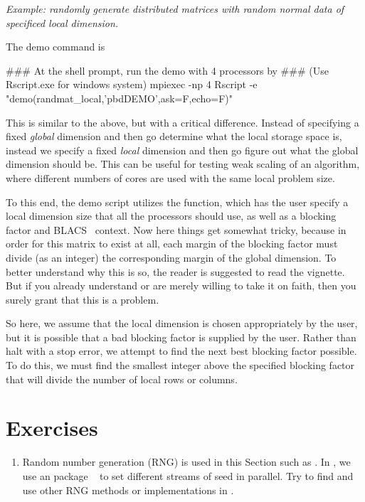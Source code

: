 \emph{Example:  randomly generate distributed matrices with random normal data 
of specificed local dimension.}

The demo command is
\begin{Command}
### At the shell prompt, run the demo with 4 processors by
### (Use Rscript.exe for windows system)
mpiexec -np 4 Rscript -e "demo(randmat_local,'pbdDEMO',ask=F,echo=F)"
\end{Command}

This is similar to the above, but with a critical difference.  Instead of 
specifying a fixed \emph{global} dimension and then go determine what the local 
storage space is, instead we specify a fixed \emph{local} dimension and then go 
figure out what the global dimension should be.  This can be useful for testing 
weak scaling of an algorithm, where different numbers of cores are used with the 
same local problem size.

To this end, the demo script utilizes the  function, 
which has the user specify a local dimension size that all the processors should 
use, as well as a blocking factor and BLACS~ context.  Now 
here things get somewhat tricky, because in order for this matrix to exist at 
all, each margin of the blocking factor must divide (as an integer) the 
corresponding margin of the global dimension.  To better understand why this is 
so, the reader is suggested to read the  vignette.  But if you 
already understand or are merely willing to take it on faith, then you surely 
grant that this is a problem.

So here, we assume that the local dimension is chosen appropriately by the user, 
but it is possible that a bad blocking factor is supplied by the user.  Rather 
than halt with a stop error, we attempt to find the next best blocking factor 
possible.  To do this, we must find the smallest integer above the specified 
blocking factor that will divide the number of local rows or columns.




\section{Exercises}
\label{sec:statistics_exercise}

\begin{enumerate}[label=\thechapter-\arabic*]
\item
Random number generation (RNG) is used in this Section such as .
In , we use an  package
~\citep{rlecuyer}
to set different streams of seed in
parallel. Try to find and use other RNG methods or implementations
in .

\end{enumerate}
